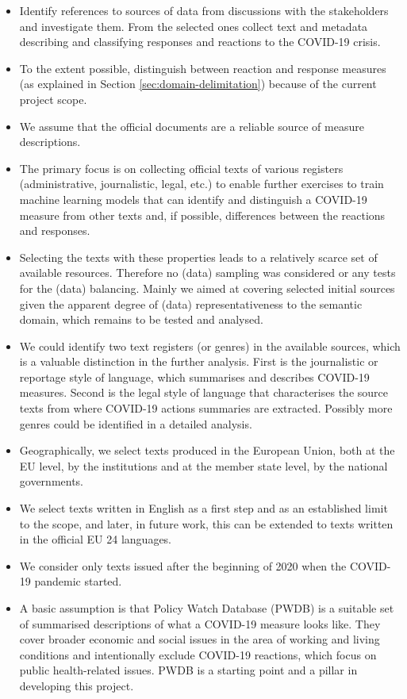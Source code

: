 \begin{itemize}
	\item Identify references to sources of data from discussions with the stakeholders and investigate them. From the selected ones collect text and metadata describing and classifying responses and reactions to the COVID-19 crisis. 
	\item To the extent possible, distinguish between reaction and response measures (as explained in Section \ref{sec:domain-delimitation}) because of the current project scope. 
	\item We assume that the official documents are a reliable source of measure descriptions.
	\item The primary focus is on collecting official texts of various registers (administrative, journalistic, legal, etc.) to enable further exercises to train machine learning models that can identify and distinguish a COVID-19 measure from other texts and, if possible, differences between the reactions and responses.
	\item Selecting the texts with these properties leads to a relatively scarce set of available resources. Therefore no (data) sampling was considered or any tests for the (data) balancing. Mainly we aimed at covering selected initial sources given the apparent degree of (data) representativeness to the semantic domain, which remains to be tested and analysed.
	\item We could identify two text registers (or genres) in the available sources, which is a valuable distinction in the further analysis. First is the journalistic or reportage style of language, which summarises and describes COVID-19 measures. Second is the legal style of language that characterises the source texts from where COVID-19 actions summaries are extracted. Possibly more genres could be identified in a detailed analysis. 
	\item Geographically, we select texts produced in the European Union, both at the EU level, by the institutions and at the member state level, by the national governments. 
	\item We select texts written in English as a first step and as an established limit to the scope, and later, in future work, this can be extended to texts written in the official EU 24 languages.
	\item We consider only texts issued after the beginning of 2020 when the COVID-19 pandemic started.

	\item A basic assumption is that Policy Watch Database (PWDB) is a suitable set of summarised descriptions of what a COVID-19 measure looks like. They cover broader economic and social issues in the area of working and living conditions and intentionally exclude COVID-19 reactions, which focus on public health-related issues. PWDB is a starting point and a pillar in developing this project. 
\end{itemize}

